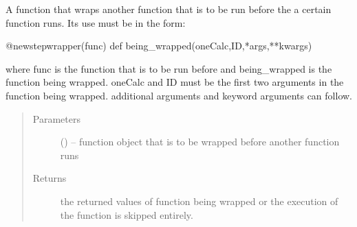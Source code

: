 \documentclass[letterpaper,10pt,english]{sphinxmanual}
\begin{document}
\begin{fulllineitems}
\label{\detokenize{prep:prep.newstepWrapper}}
A function that wraps another function that is to be run before the
a certain function runs. Its use must be in the form:

@newstepwrapper(func)
def being\_wrapped(oneCalc,ID,*args,**kwargs)

where func is the function that is to be run before and being\_wrapped
is the function being wrapped. oneCalc and ID must be the first two
arguments in the function being wrapped. additional arguments and
keyword arguments can follow.
\begin{quote}\begin{description}
\item[{Parameters}] \leavevmode
{} () -- function object that is to be wrapped before another function runs

\item[{Returns}] \leavevmode
the returned values of function being wrapped or the execution of the function
is skipped entirely.

\end{description}\end{quote}

\end{fulllineitems}

\end{document}
